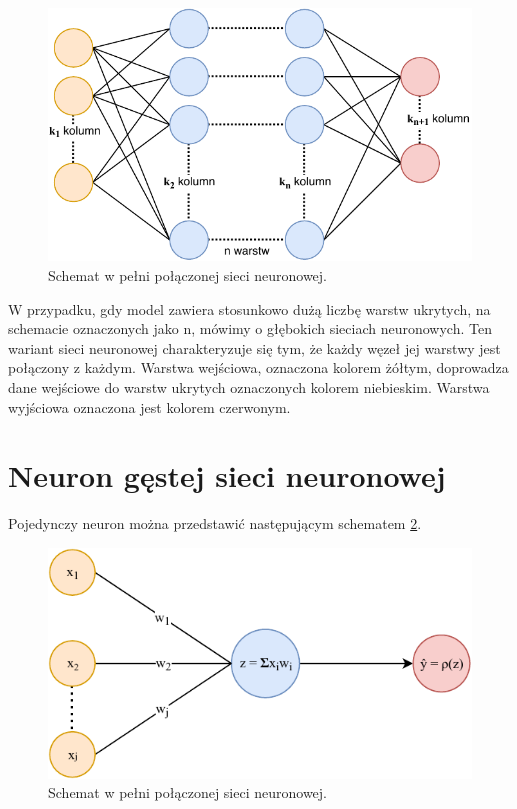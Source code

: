 \begin{figure}[ht]
\centerline{\includegraphics[scale=0.9]{resources/fc/fully_connected.pdf}}
\caption{Schemat w pełni połączonej sieci neuronowej.}
\label{fig:schematFc}
\end{figure}

W przypadku, gdy model zawiera stosunkowo dużą liczbę warstw ukrytych, na schemacie oznaczonych jako n, mówimy o głębokich sieciach neuronowych. 
Ten wariant sieci neuronowej charakteryzuje się tym, że każdy węzeł jej warstwy jest połączony z każdym. Warstwa wejściowa, oznaczona kolorem żółtym, doprowadza dane wejściowe do warstw ukrytych oznaczonych kolorem niebieskim. Warstwa wyjściowa oznaczona jest kolorem czerwonym.

\section{Neuron gęstej sieci neuronowej}
Pojedynczy neuron można przedstawić następującym schematem \ref{fig:neuronFc}.

\begin{figure}[ht]
\centerline{\includegraphics[scale=1]{resources/fc/single_neuron_fc.pdf}}
\caption{Schemat w pełni połączonej sieci neuronowej.}
\label{fig:neuronFc}
\end{figure}

